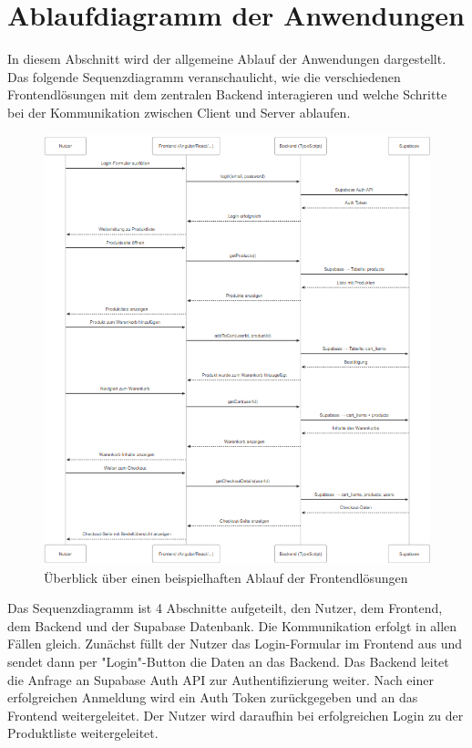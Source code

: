 \documentclass[oneside]{ausarbeitung}
\begin{document}
\section{Ablaufdiagramm der Anwendungen}
\label{sec:ablauf}

In diesem Abschnitt wird der allgemeine Ablauf der Anwendungen dargestellt. Das folgende Sequenzdiagramm veranschaulicht, wie die verschiedenen Frontendlösungen mit dem zentralen Backend interagieren und welche Schritte bei der Kommunikation zwischen Client und Server ablaufen.

\begin{figure}[H]
    \centering
    \includegraphics[width=\textwidth]{images/sequenzdiagramm}
    \caption{Überblick über einen beispielhaften Ablauf der Frontendlösungen}
    \label{fig:applikationsstruktur}
\end{figure}

Das Sequenzdiagramm ist 4 Abschnitte aufgeteilt, den Nutzer, dem Frontend, dem Backend und der Supabase Datenbank. Die Kommunikation erfolgt in allen Fällen gleich. 
Zunächst füllt der Nutzer das Login-Formular im Frontend aus und sendet dann per "Login"-Button die Daten an das Backend. Das Backend leitet die Anfrage an Supabase Auth API zur Authentifizierung weiter. Nach einer erfolgreichen Anmeldung wird ein Auth Token zurückgegeben und an das Frontend weitergeleitet. Der Nutzer wird daraufhin bei erfolgreichen Login zu der Produktliste weitergeleitet.
\end{document}
